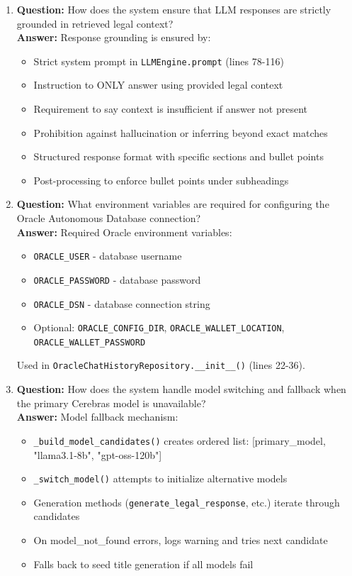 \documentclass[11pt]{article}
\begin{document}
\begin{enumerate}
\item \textbf{Question:} How does the system ensure that LLM responses are strictly grounded in retrieved legal context?
\\ \textbf{Answer:} Response grounding is ensured by:
\begin{itemize}
\item Strict system prompt in \texttt{LLMEngine.prompt} (lines 78-116)
\item Instruction to ONLY answer using provided legal context
\item Requirement to say context is insufficient if answer not present
\item Prohibition against hallucination or inferring beyond exact matches
\item Structured response format with specific sections and bullet points
\item Post-processing to enforce bullet points under subheadings
\end{itemize}

\item \textbf{Question:} What environment variables are required for configuring the Oracle Autonomous Database connection?
\\ \textbf{Answer:} Required Oracle environment variables:
\begin{itemize}
\item \texttt{ORACLE\_USER} - database username
\item \texttt{ORACLE\_PASSWORD} - database password
\item \texttt{ORACLE\_DSN} - database connection string
\item Optional: \texttt{ORACLE\_CONFIG\_DIR}, \texttt{ORACLE\_WALLET\_LOCATION}, \texttt{ORACLE\_WALLET\_PASSWORD}
\end{itemize}
Used in \texttt{OracleChatHistoryRepository.\_\_init\_\_()} (lines 22-36).

\item \textbf{Question:} How does the system handle model switching and fallback when the primary Cerebras model is unavailable?
\\ \textbf{Answer:} Model fallback mechanism:
\begin{itemize}
\item \texttt{\_build\_model\_candidates()} creates ordered list: [primary\_model, "llama3.1-8b", "gpt-oss-120b"]
\item \texttt{\_switch\_model()} attempts to initialize alternative models
\item Generation methods (\texttt{generate\_legal\_response}, etc.) iterate through candidates
\item On model\_not\_found errors, logs warning and tries next candidate
\item Falls back to seed title generation if all models fail
\end{itemize}
\end{enumerate}
\end{document}
